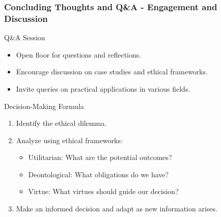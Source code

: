 \documentclass[aspectratio=169]{beamer}
\begin{document}
\begin{frame}[fragile]
    \frametitle{Concluding Thoughts and Q\&A - Engagement and Discussion}
    \begin{block}{Q\&A Session}
        \begin{itemize}
            \item Open floor for questions and reflections.
            \item Encourage discussion on case studies and ethical frameworks.
            \item Invite queries on practical applications in various fields.
        \end{itemize}
    \end{block}
    
    \begin{block}{Decision-Making Formula}
        \begin{enumerate}
            \item Identify the ethical dilemma.
            \item Analyze using ethical frameworks:
            \begin{itemize}
                \item Utilitarian: What are the potential outcomes?
                \item Deontological: What obligations do we have?
                \item Virtue: What virtues should guide our decision?
            \end{itemize}
            \item Make an informed decision and adapt as new information arises.
        \end{enumerate}
    \end{block}
\end{frame}
\end{document}
